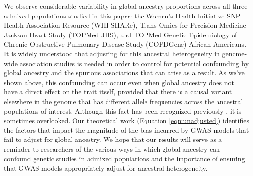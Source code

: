 \documentclass[12pt]{article}
\begin{document}
We observe considerable variability in global ancestry proportions across all three admixed populations studied in this paper: the Women's Health Initiative SNP Health Association Resource (WHI SHARe), Trans-Omics for Precision Medicine Jackson Heart Study (TOPMed JHS), and TOPMed Genetic Epidemiology of Chronic Obstructive Pulmonary Disease Study (COPDGene) African Americans.
It is widely understood that adjusting for this ancestral heterogeneity in genome-wide association studies is needed in order to control for potential confounding by global ancestry and the spurious associations that can arise as a result. %
As we've shown above, this confounding can occur even when global ancestry does not have a direct effect on the trait itself, provided that there is a causal variant elsewhere in the genome that has different allele frequencies across the ancestral populations of interest. %
Although this fact has been recognized previously \citep{wacholder2002}, it is sometimes overlooked. 
Our theoretical work (Equation \ref{eqn:unadjusted}) identifies the factors that impact the magnitude of the bias incurred by GWAS models that fail to adjust for global ancestry. 
We hope that our results will serve as a reminder to researchers of the various ways in which global ancestry can confound genetic studies in admixed populations and the importance of ensuring that GWAS models appropriately adjust for ancestral heterogeneity.
\end{document}
